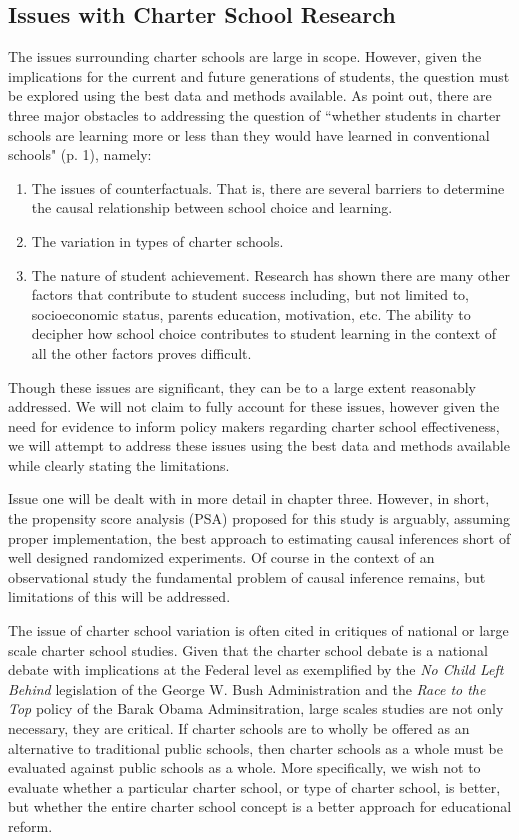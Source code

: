 \documentclass[letterpaper,12p,twoside]{article} %
\begin{document}
\subsection{Issues with Charter School Research}
The issues surrounding charter schools are large in scope. However, given the implications for the current and future generations of students, the question must be explored using the best data and methods available. As  point out, there are three major obstacles to addressing the question of ``whether students in charter schools are learning more or less than they would have learned in conventional schools" (p. 1), namely:

\begin{enumerate}
\item The issues of counterfactuals. That is, there are several barriers to determine the causal relationship between school choice and learning.
\item The variation in types of charter schools.
\item The nature of student achievement. Research has shown there are many other factors that contribute to student success including, but not limited to, socioeconomic status, parents education, motivation, etc. The ability to decipher how school choice contributes to student learning in the context of all the other factors proves difficult.
\end{enumerate}

Though these issues are significant, they can be to a large extent reasonably addressed. We will not claim to fully account for these issues, however given the need for evidence to inform policy makers regarding charter school effectiveness, we will attempt to address these issues using the best data and methods available while clearly stating the limitations.

Issue one will be dealt with in more detail in chapter three. However, in short, the propensity score analysis (PSA) proposed for this study is arguably, assuming proper implementation, the best approach to estimating causal inferences short of well designed randomized experiments. Of course in the context of an observational study the fundamental problem of causal inference  remains, but limitations of this will be addressed.

The issue of charter school variation is often cited in critiques of national or large scale charter school studies. Given that the charter school debate is a national debate with implications at the Federal level as exemplified by the \textit{No Child Left Behind} legislation of the George W. Bush Administration and the \textit{Race to the Top} policy of the Barak Obama Adminsitration, large scales studies are not only necessary, they are critical. If charter schools are to wholly be offered as an alternative to traditional public schools, then charter schools as a whole must be evaluated against public schools as a whole. More specifically, we wish not to evaluate whether a particular charter school, or type of charter school, is better, but whether the entire charter school concept is a better approach for educational reform.
\end{document}
